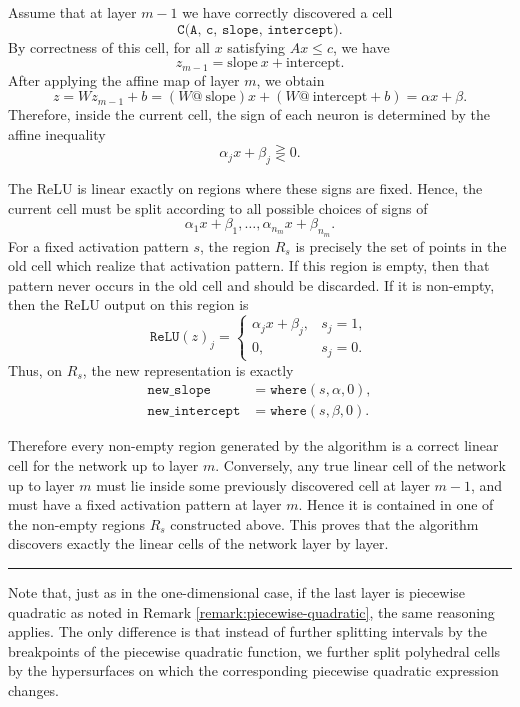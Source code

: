 \documentclass[10pt]{extarticle}
\begin{document}
Assume that at layer $m-1$ we have correctly discovered a cell
\[
\texttt{C(A, c, slope, intercept)}.
\]
By correctness of this cell, for all $x$ satisfying $A x \leq c$, we have
\[
z_{m-1} = \text{slope} \ x + \text{intercept}.
\]
After applying the affine map of layer $m$, we obtain
\[
z = Wz_{m-1}+b
= (W \texttt{@} \ \text{slope})x
+ (W \texttt{@} \ \text{intercept}+b)
= \alpha x + \beta.
\]
Therefore, inside the current cell, the sign of each neuron is determined by the affine inequality
\[
\alpha_j x + \beta_j \gtreqless 0.
\]

The ReLU is linear exactly on regions where these signs are fixed.  Hence, the current cell must
be split according to all possible choices of signs of
\[
\alpha_1 x + \beta_1,\ldots,\alpha_{n_m}x+\beta_{n_m}.
\]
For a fixed activation pattern $s$, the region $R_s$ is precisely the set of points in the old
cell which realize that activation pattern.  If this region is empty, then that pattern never
occurs in the old cell and should be discarded.  If it is non-empty, then the ReLU output on this
region is
\[
\texttt{ReLU}(z)_j =
\begin{cases}
\alpha_j x + \beta_j, & s_j=1, \\
0, & s_j=0.
\end{cases}
\]
Thus, on $R_s$, the new representation is exactly
\begin{align}
\texttt{new\_slope}
&= \texttt{where}(s, \alpha, 0), \\
\texttt{new\_intercept}
&= \texttt{where}(s, \beta, 0).
\end{align}

Therefore every non-empty region generated by the algorithm is a correct linear cell for the
network up to layer $m$. Conversely, any true linear cell of the network up to layer $m$ must
lie inside some previously discovered cell at layer $m-1$, and must have a fixed activation
pattern at layer $m$. Hence it is contained in one of the non-empty regions $R_s$ constructed
above. This proves that the algorithm discovers exactly the linear cells of the network layer by
layer.

\vspace{1em}
\hrule
\vspace{1em}

Note that, just as in the one-dimensional case, if the last layer is piecewise quadratic as noted
in Remark \ref{remark:piecewise-quadratic}, the same reasoning applies.  The only difference is
that instead of further splitting intervals by the breakpoints of the piecewise quadratic
function, we further split polyhedral cells by the hypersurfaces on which the corresponding
piecewise quadratic expression changes.
\end{document}
